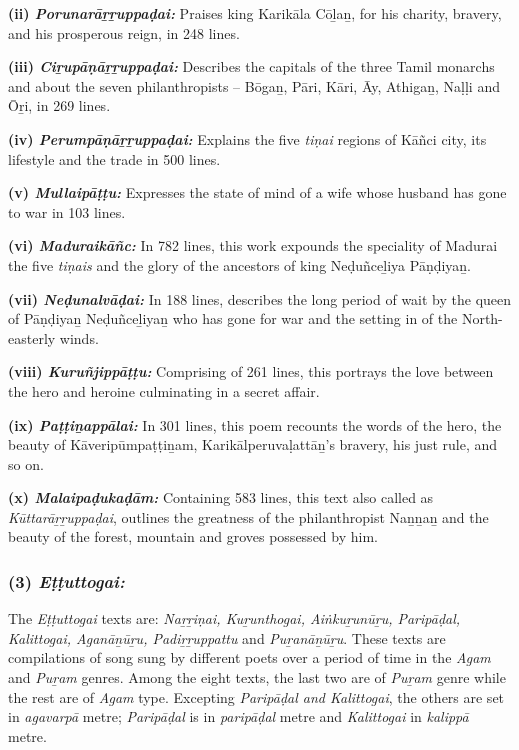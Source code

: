 \textbf{(ii) \textit{Porunarāṟṟuppaḍai:}} Praises king Karikāla Cōḻaṉ, for his charity, bravery, and his prosperous reign, in 248 lines.

\textbf{(iii) \textit{Ciṟupāṇāṟṟuppaḍai:}} Describes the capitals of the three Tamil monarchs and about the seven philanthropists – Bōgaṉ, Pāri, Kāri, Āy, Athigaṉ, Naḷḷi and Ōṟi, in 269 lines.

\textbf{(iv) \textit{Perumpāṇāṟṟuppaḍai:}} Explains the five \textit{tiṇai} regions of Kāñci city, its lifestyle and the trade in 500 lines.

\textbf{(v) \textit{Mullaipāṭṭu:}} Expresses the state of mind of a wife whose husband has gone to war in 103 lines.

\textbf{(vi) \textit{Maduraikāñc:}} In 782 lines, this work expounds the speciality of Madurai the five \textit{tiṇais} and the glory of the ancestors of king Neḍuñceḻiya Pāṇḍiyaṉ.

\textbf{(vii) \textit{Neḍunalvāḍai:}} In 188 lines, describes the long period of wait by the queen of Pāṇḍiyaṉ Neḍuñceḻiyaṉ who has gone for war and the setting in of the North-easterly winds.

\textbf{(viii) \textit{Kuruñjippāṭṭu:}} Comprising of 261 lines, this portrays the love between the hero and heroine culminating in a secret affair.

\textbf{(ix) \textit{Paṭṭiṉappālai:}} In 301 lines, this poem recounts the words of the hero, the beauty of Kāveripūmpaṭṭiṉam, Karikālperuvaḷattāṉ's bravery, his just rule, and so on.

\textbf{(x) \textit{Malaipaḍukaḍām:}} Containing 583 lines, this text also called as \textit{Kūttarāṟṟuppaḍai}, outlines the greatness of the philanthropist Naṉṉaṉ and the beauty of the forest, mountain and groves possessed by him.


\subsubsection*{(3) \textit{Eṭṭuttogai:}}

\vskip -7pt

The \textit{Eṭṭuttogai} texts are: \textit{Naṟṟiṇai, Kuṟunthogai, Aiṅkuṟunūṟu, Paripāḍal, Kalittogai, Aganāṉūṟu, Padiṟṟuppattu} and \textit{Puṟanāṉūṟu}. These texts are compilations of song sung by different poets over a period of time in the \textit{Agam} and \textit{Puṟam} genres. Among the eight texts, the last two are of \textit{Puṟam} genre while the rest are of \textit{Agam} type. Excepting \textit{Paripāḍal and Kalittogai}, the others are set in \textit{agavarpā} metre; \textit{Paripāḍal} is in \textit{paripāḍal} metre and \textit{Kalittogai} in \textit{kalippā} metre.


